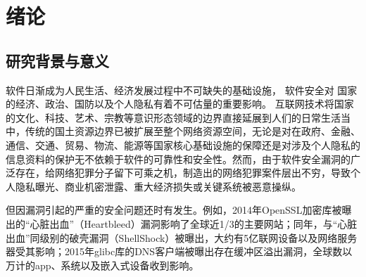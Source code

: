 \chapter{绪论}
\section{研究背景与意义}
软件日渐成为人民生活、经济发展过程中不可缺失的基础设施， %
软件安全对
国家的经济、政治、国防以及个人隐私有着不可估量的重要影响。
互联网技术将国家的文化、科技、艺术、宗教等意识形态领域的边界直接延展到人们的日常生活当中，传统的国土资源边界已被扩展至整个网络资源空间，无论是对在政府、金融、通信、交通、贸易、物流、能源等国家核心基础设施的保障还是对涉及个人隐私的信息资料的保护无不依赖于软件的可靠性和安全性。然而，由于软件安全漏洞的广泛存在，给网络犯罪分子留下可乘之机，制造出的网络犯罪案件层出不穷，导致个人隐私曝光、商业机密泄露、重大经济损失或关键系统被恶意操纵。


但因漏洞引起的严重的安全问题还时有发生。例如，2014年OpenSSL加密库被曝出的“心脏出血”（Heartbleed）漏洞影响了全球近1/3的主要网站；同年，与“心脏出血”同级别的破壳漏洞（ShellShock）被曝出，大约有5亿联网设备以及网络服务器受其影响；2015年glibc库的DNS客户端被曝出存在缓冲区溢出漏洞，全球数以万计的app、系统以及嵌入式设备收到影响。



